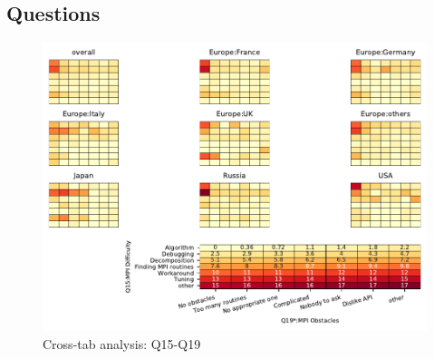 
\subsection{Questions}


\begin{figure}
\begin{center}
\includegraphics[width=12cm]{../pdfs/Q15-Q19.pdf}
\caption{Cross-tab analysis: Q15-Q19}
\label{fig:Q15-Q19}
\end{center}
\end{figure}
